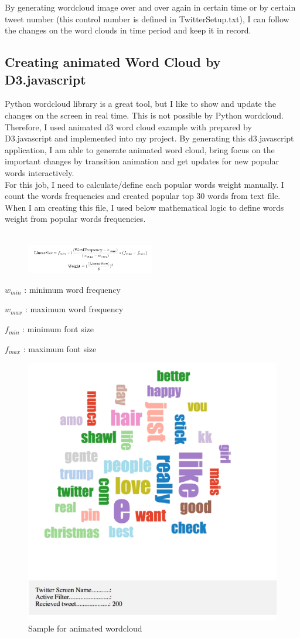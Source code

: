 \documentclass[12pt,notitlepage]{article}
\begin{document}
By generating wordcloud image over and over again in certain time or by certain tweet number (this control number is defined in TwitterSetup.txt), I can follow the changes on the word clouds in time period and keep it in record.


\subsection{Creating animated Word Cloud by D3.javascript} 

Python wordcloud library is a great tool, but I like to show and update the changes on the screen in real time. This is not possible by Python wordcloud. Therefore, I used animated d3 word cloud example \cite{Whitfield:2016} with prepared by D3.javascript  and implemented into my project. By generating this d3.javascript application, I am able to generate animated word cloud, bring focus on the important changes by transition animation and get updates for new popular words interactively.
\\

For this job, I need to calculate/define each popular words weight manually. I count the words frequencies and created popular top 30 words from text file. When I am creating this file, I used below mathematical logic to define words weight from popular words frequencies.\\
\\

\begin{figure}
	\vspace{-42pt}
	\centering
	\includegraphics[width=0.5\textwidth]{D3jsWordCloud_1.pdf}
	\caption{}
	\label{fig:D3jsWordCloud_1}
\end{figure}


$w_{min}$ : minimum word frequency  \

$w_{max}$ : maximum word frequency \

$f_{min}$ : minimum font size \

$f_{max}$ : maximum font size \

\begin{figure}[htb]
	\centering
	\includegraphics[width=0.4\linewidth]{D3jsWordCloud_4.pdf}
	\caption{Sample for animated wordcloud}
	\label{fig:D3jsWordCloud_4}
\end{figure}
\end{document}
